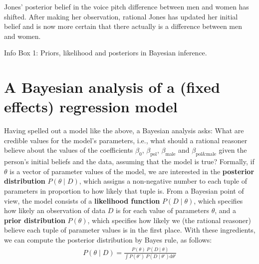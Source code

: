 \documentclass[nobib]{tufte-handout}
\begin{document}
\begin{InfoBox}[]
{\begin{minipage}{1.0\textwidth}

    Jones' posterior belief in the voice pitch difference between men and women has shifted. After making her observation, rational Jones has updated her initial belief and is now more certain that there actually is a difference between men and women.
    
  \end{minipage} \par
  } \par
  \begin{center}
    Info Box 1: Priors, likelihood and posteriors in Bayesian inference.
  \end{center}
\end{InfoBox}


\section{A Bayesian analysis of a (fixed effects) regression model}

Having spelled out a model like the above, a Bayesian analysis asks: What are credible values for the model's parameters, i.e., what should a rational reasoner believe about the values of the coefficients $\beta_0$, $\beta_{\text{pol}}$, $\beta_{\text{male}}$ and $\beta_{\text{pol\&male}}$ given the person's initial beliefs and the data, assuming that the model is true?
%
%
Formally, if $\theta$ is a vector of parameter values of the model, we are interested in the \textbf{posterior distribution} $P(\theta \mid D)$, which assigns a non-negative number to each tuple of parameters in proportion to how likely that tuple is.
From a Bayesian point of view, the model consists of a \textbf{likelihood function} $P(D \mid \theta)$, which specifies how likely an observation of data $D$ is for each value of parameters $\theta$, and a \textbf{prior distribution} $P(\theta)$, which specifies how likely we (the rational reasoner) believe each tuple of parameter values is in the first place.
%
%
With these ingredients, we can compute the posterior distribution by Bayes rule, as follows:
\begin{eqnarray*}
  P(\theta \mid D) = \frac{P(\theta) \ P(D \mid \theta)}{ \int P(\theta') \ P(D \mid
  \theta') \textrm{d}\theta'}
\end{eqnarray*}
\end{document}
